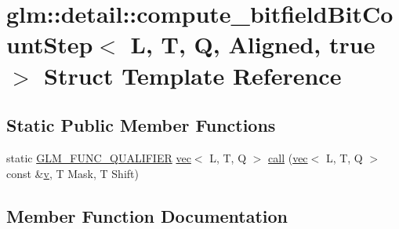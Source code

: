 \hypertarget{structglm_1_1detail_1_1compute__bitfield_bit_count_step_3_01_l_00_01_t_00_01_q_00_01_aligned_00_01true_01_4}{}\section{glm\+:\+:detail\+:\+:compute\+\_\+bitfield\+Bit\+Count\+Step$<$ L, T, Q, Aligned, true $>$ Struct Template Reference}
\label{structglm_1_1detail_1_1compute__bitfield_bit_count_step_3_01_l_00_01_t_00_01_q_00_01_aligned_00_01true_01_4}
\subsection*{Static Public Member Functions}
\begin{DoxyCompactItemize}
\item 
static \mbox{\hyperlink{setup_8hpp_a33fdea6f91c5f834105f7415e2a64407}{G\+L\+M\+\_\+\+F\+U\+N\+C\+\_\+\+Q\+U\+A\+L\+I\+F\+I\+ER}} \mbox{\hyperlink{structglm_1_1vec}{vec}}$<$ L, T, Q $>$ \mbox{\hyperlink{structglm_1_1detail_1_1compute__bitfield_bit_count_step_3_01_l_00_01_t_00_01_q_00_01_aligned_00_01true_01_4_a8edab4daff7f1593b8c211b5b64aff24}{call}} (\mbox{\hyperlink{structglm_1_1vec}{vec}}$<$ L, T, Q $>$ const \&\mbox{\hyperlink{_s_d_l__opengl_8h_a10a82eabcb59d2fcd74acee063775f90}{v}}, T Mask, T Shift)
\end{DoxyCompactItemize}


\subsection{Member Function Documentation}
\mbox{\label{structglm_1_1detail_1_1compute__bitfield_bit_count_step_3_01_l_00_01_t_00_01_q_00_01_aligned_00_01true_01_4_a8edab4daff7f1593b8c211b5b64aff24}} 
